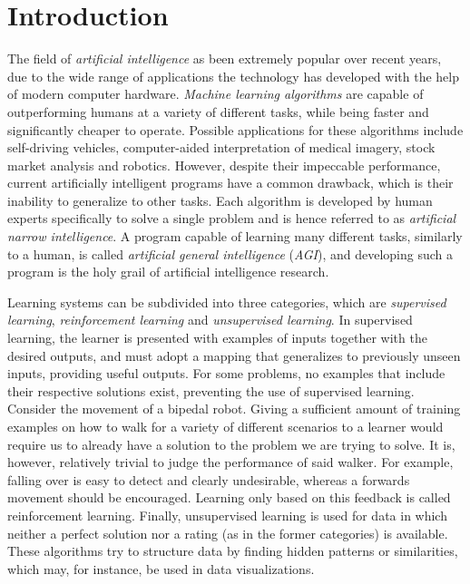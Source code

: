\section{Introduction}
The field of \textit{artificial intelligence} as been extremely popular over recent years, due to the wide range of applications the technology has developed with the help of modern computer hardware. \textit{Machine learning algorithms} are capable of outperforming humans at a variety of different tasks, while being faster and significantly cheaper to operate. Possible applications for these algorithms include self-driving vehicles, computer-aided interpretation of medical imagery, stock market analysis and robotics. However, despite their impeccable performance, current artificially intelligent programs have a common drawback, which is their inability to generalize to other tasks. Each algorithm is developed by human experts specifically to solve a single problem and is hence referred to as \textit{artificial narrow intelligence}. A program capable of learning many different tasks, similarly to a human, is called \textit{artificial general intelligence} (\textit{AGI}), and developing such a program is the holy grail of artificial intelligence research.

Learning systems can be subdivided into three categories, which are \textit{supervised learning}, \textit{reinforcement learning} and \textit{unsupervised learning}. In supervised learning, the learner is presented with examples of inputs together with the desired outputs, and must adopt a mapping that generalizes to previously unseen inputs, providing useful outputs. For some problems, no examples that include their respective solutions exist, preventing the use of supervised learning. Consider the movement of a bipedal robot. Giving a sufficient amount of training examples on how to walk for a variety of different scenarios to a learner would require us to already have a solution to the problem we are trying to solve. It is, however, relatively trivial to judge the performance of said walker. For example, falling over is easy to detect and clearly undesirable, whereas a forwards movement should be encouraged. Learning only based on this feedback is called reinforcement learning. Finally, unsupervised learning is used for data in which neither a perfect solution nor a rating (as in the former categories) is available. These algorithms try to structure data by finding hidden patterns or similarities, which may, for instance, be used in data visualizations.


